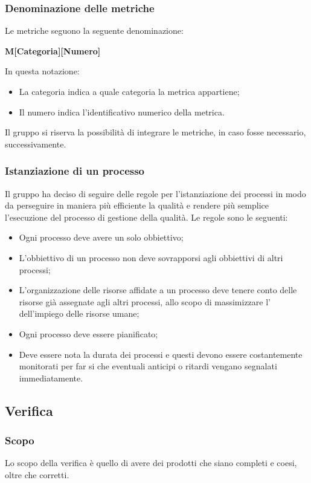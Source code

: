 \documentclass[../norme_di_progetto.tex]{subfiles}
\begin{document}
\subsubsection{Denominazione delle metriche}
Le metriche seguono la seguente denominazione:
\begin{center}
    \textbf{M[Categoria][Numero]}
\end{center}
In questa notazione:
\begin{itemize}
    \item La categoria indica a quale categoria la metrica appartiene;
    \item Il numero indica l'identificativo numerico della metrica.
\end{itemize}
Il gruppo si riserva la possibilità di integrare le metriche, in caso fosse necessario, successivamente.

\subsubsection{Istanziazione di un processo}
Il gruppo ha deciso di seguire delle regole per l'istanziazione dei processi in modo da perseguire in maniera più efficiente la qualità e rendere più semplice l'esecuzione del processo di gestione della qualità. Le regole sono le seguenti:
\begin{itemize}
    \item Ogni processo deve avere un solo obbiettivo;
    \item L'obbiettivo di un processo non deve sovrapporsi agli obbiettivi di altri processi;
    \item L'organizzazione delle risorse affidate a un processo deve tenere conto delle risorse già assegnate agli altri processi, allo scopo di massimizzare l' dell'impiego delle risorse umane;
    \item Ogni processo deve essere pianificato;
    \item Deve essere nota la durata dei processi e questi devono essere costantemente monitorati per far si che eventuali anticipi o ritardi vengano segnalati immediatamente.
\end{itemize}

\subsection{Verifica}

\subsubsection{Scopo}
Lo scopo della verifica è quello di avere dei prodotti che siano completi e coesi, oltre che corretti.
\end{document}
